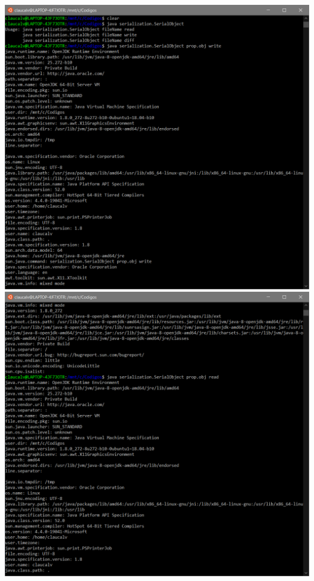 \vspace{2em}
\begin{minipage}{\textwidth}
    \hspace{-1em}
    \centering
    \includegraphics[scale=.35]{pratica2remover/prints/serial1.PNG}
    \hspace{1em}
    \includegraphics[scale=.35]{pratica2remover/prints/serial2.PNG}

\end{minipage}
